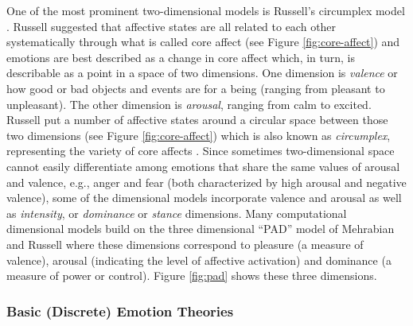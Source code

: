\documentclass[12pt]{report}
\begin{document}
One of the most prominent two-dimensional models is Russell's circumplex model
\cite{russell:circumplex-affect}. Russell suggested that affective states are
all related to each other systematically through what is called core affect
\cite{russell:circumplex-affect,russell:core-affect} (see Figure
\ref{fig:core-affect}) and emotions are best described as a change in core
affect which, in turn, is describable as a point in a space of two dimensions.
One dimension is \textit{valence} or how good or bad objects and events are for
a being (ranging from pleasant to unpleasant). The other dimension is
\textit{arousal}, ranging from calm to excited. Russell put a number of
affective states around a circular space between those two dimensions (see
Figure \ref{fig:core-affect}) which is also known as \textit{circumplex},
representing the variety of core affects
\cite{russell:circumplex-affect,russell:core-affect}. Since sometimes
two-dimensional space cannot easily differentiate among emotions that share the
same values of arousal and valence, e.g., anger and fear (both characterized by
high arousal and negative valence), some of the dimensional models incorporate
valence and arousal as well as \textit{intensity}, or \textit{dominance} or
\textit{stance} dimensions. Many computational dimensional models build on the
three dimensional “PAD” model of Mehrabian and Russell
\cite{mehrabian-russell:pad} where these dimensions correspond to pleasure (a
measure of valence), arousal (indicating the level of affective activation) and
dominance (a measure of power or control). Figure \ref{fig:pad} shows these
three dimensions.


\subsubsection{Basic (Discrete) Emotion Theories}
\label{sec:discrete-emotions}
\end{document}
